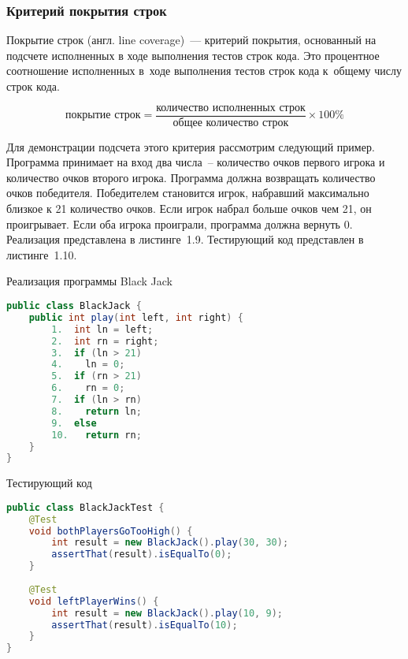 \subsubsection{Критерий покрытия строк}

Покрытие строк (англ. line coverage)~--- критерий покрытия, основанный на подсчете исполненных в ходе выполнения тестов строк кода. Это процентное соотношение исполненных в~ходе выполнения тестов строк кода к~общему числу строк кода.

\[ \text{покрытие строк} = \frac{\text{количество исполненных строк}}{\text{общее количество строк}}  \times 100 \% \]

Для демонстрации подсчета этого критерия рассмотрим следующий пример. Программа принимает на вход два числа~-- количество очков первого игрока и количество очков второго игрока. Программа должна возвращать количество очков победителя. Победителем становится игрок, набравший максимально близкое к 21 количество очков. Если игрок набрал больше очков чем 21, он проигрывает. Если оба игрока проиграли, программа должна вернуть 0. Реализация представлена в листинге~1.9. Тестирующий код представлен в листинге~1.10.

\begin{ListingEnv}[!h]%
	\captiondelim{ } %
	\caption{Реализация программы Black Jack}
	\begin{lstlisting}[language={Java}]
public class BlackJack {
	public int play(int left, int right) {
		1.  int ln = left;
		2.  int rn = right;
		3.  if (ln > 21)
		4.    ln = 0;
		5.  if (rn > 21)
		6.    rn = 0;
		7.  if (ln > rn)
		8.    return ln;
		9.  else
		10.   return rn;
	}
}
	\end{lstlisting}
\end{ListingEnv}%

\begin{ListingEnv}[!h]%
	\captiondelim{ } %
	\caption{Тестирующий код}
	\begin{lstlisting}[language={Java}]
public class BlackJackTest {
	@Test
	void bothPlayersGoTooHigh() {
		int result = new BlackJack().play(30, 30);
		assertThat(result).isEqualTo(0);
	}
	
	@Test
	void leftPlayerWins() {
		int result = new BlackJack().play(10, 9);
		assertThat(result).isEqualTo(10);
	}
}
	\end{lstlisting}
\end{ListingEnv}%

